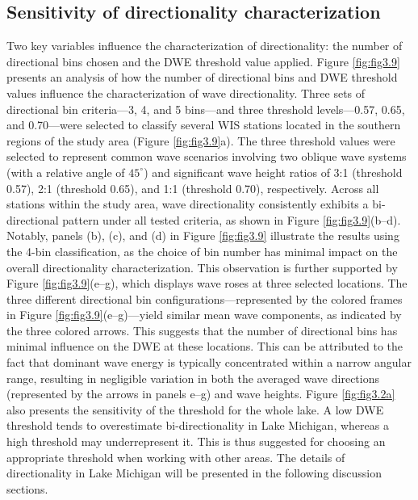 \subsection{Sensitivity of directionality characterization}
\label{c3_Sensitivity of directionality characterization}
Two key variables influence the characterization of directionality: the number of directional bins chosen and the DWE threshold value applied. Figure \ref{fig:fig3.9} presents an analysis of how the number of directional bins and DWE threshold values influence the characterization of wave directionality. Three sets of directional bin criteria—3, 4, and 5 bins—and three threshold levels—0.57, 0.65, and 0.70—were selected to classify several WIS stations located in the southern regions of the study area (Figure \ref{fig:fig3.9}a). The three threshold values were selected to represent common wave scenarios involving two oblique wave systems (with a relative angle of $45^\circ$) and significant wave height ratios of 3:1 (threshold 0.57), 2:1 (threshold 0.65), and 1:1 (threshold 0.70), respectively. Across all stations within the study area, wave directionality consistently exhibits a bi-directional pattern under all tested criteria, as shown in Figure \ref{fig:fig3.9}(b–d). Notably, panels (b), (c), and (d) in Figure \ref{fig:fig3.9} illustrate the results using the 4-bin classification, as the choice of bin number has minimal impact on the overall directionality characterization. This observation is further supported by Figure \ref{fig:fig3.9}(e–g), which displays wave roses at three selected locations. The three different directional bin configurations—represented by the colored frames in Figure \ref{fig:fig3.9}(e–g)—yield similar mean wave components, as indicated by the three colored arrows. This suggests that the number of directional bins has minimal influence on the DWE at these locations. This can be attributed to the fact that dominant wave energy is typically concentrated within a narrow angular range, resulting in negligible variation in both the averaged wave directions (represented by the arrows in panels e–g) and wave heights. Figure \ref{fig:fig3.2a} also presents the sensitivity of the threshold for the whole lake. A low DWE threshold tends to overestimate bi-directionality in Lake Michigan, whereas a high threshold may underrepresent it. This is thus suggested for choosing an appropriate threshold when working with other areas. The details of directionality in Lake Michigan will be presented in the following discussion sections.


